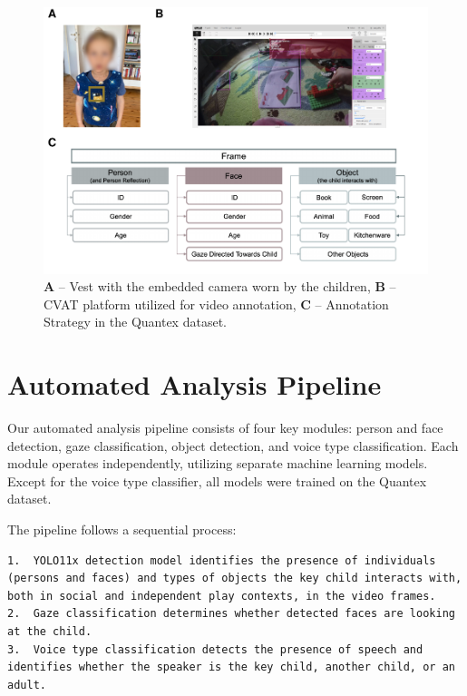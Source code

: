 \documentclass[
  man,floatsintext]{apa6}
\begin{document}
\begin{figure}

{\centering \includegraphics{Quantex_interaction_paper_files/figure-latex/sup-camera-cvat-activity-classes-1} 

}

\caption{\textbf{A} – Vest with the embedded camera worn by the children, \textbf{B} – CVAT platform utilized for video annotation, \textbf{C} – Annotation Strategy in the Quantex dataset.}\label{fig:sup-camera-cvat-activity-classes}
\end{figure}

\section{Automated Analysis Pipeline}\label{sup-automatic-analysis}

Our automated analysis pipeline consists of four key modules: person and face detection, gaze classification, object detection, and voice type classification. Each module operates independently, utilizing separate machine learning models. Except for the voice type classifier, all models were trained on the Quantex dataset.

The pipeline follows a sequential process:

\begin{verbatim}
1.  YOLO11x detection model identifies the presence of individuals (persons and faces) and types of objects the key child interacts with, both in social and independent play contexts, in the video frames.
2.  Gaze classification determines whether detected faces are looking at the child.
3.  Voice type classification detects the presence of speech and identifies whether the speaker is the key child, another child, or an adult.
\end{verbatim}
\end{document}
